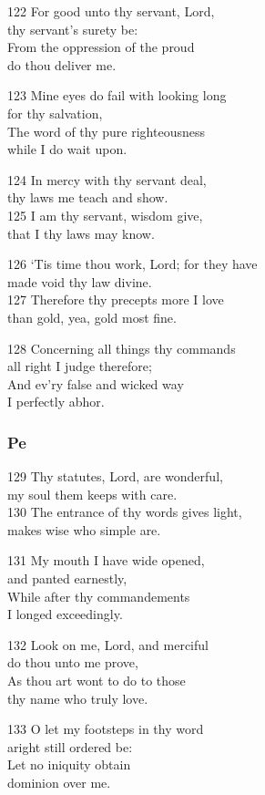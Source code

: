 122 For good unto thy servant, Lord,\\
thy servant’s surety be:\\
From the oppression of the proud\\
do thou deliver me.

123 Mine eyes do fail with looking long\\
for thy salvation,\\
The word of thy pure righteousness\\
while I do wait upon.

124 In mercy with thy servant deal,\\
thy laws me teach and show.\\
125 I am thy servant, wisdom give,\\
that I thy laws may know.

126 ‘Tis time thou work, Lord; for they have\\
made void thy law divine.\\
127 Therefore thy precepts more I love\\
than gold, yea, gold most fine.

128 Concerning all things thy commands\\
all right I judge therefore;\\
And ev’ry false and wicked way\\
I perfectly abhor.


\subsubsection*{Pe}

129 Thy statutes, Lord, are wonderful,\\
my soul them keeps with care.\\
130 The entrance of thy words gives light,\\
makes wise who simple are.

131 My mouth I have wide opened,\\
and panted earnestly,\\
While after thy commandements\\
I longed exceedingly.

132 Look on me, Lord, and merciful\\
do thou unto me prove,\\
As thou art wont to do to those\\
thy name who truly love.

133 O let my footsteps in thy word\\
aright still ordered be:\\
Let no iniquity obtain\\
dominion over me.

